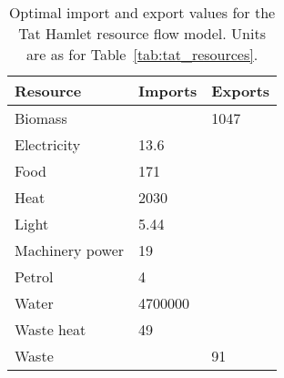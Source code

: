 \begin{table}[h]
	\centering
	\caption{Optimal import and export values for the Tat Hamlet resource flow model. Units are as for Table~\ref{tab:tat_resources}.} \label{tab:tat_basic_results}
	\begin{tabular}{lll}
		\toprule
		Resource  & Imports & Exports \\
		\midrule
		Biomass & & 1047 \\
		Electricity & 13.6 & \\
		Food & 171 & \\
		Heat & 2030 & \\
		Light & 5.44 & \\
		Machinery power & 19 & \\
		Petrol & 4 & \\
		Water & 4700000 & \\
		Waste heat & 49 & \\
		Waste & & 91 \\
		\bottomrule
	\end{tabular}
\end{table}


